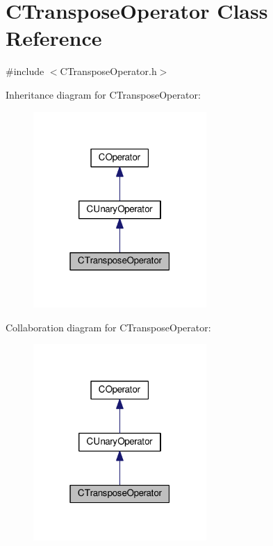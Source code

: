 \hypertarget{classCTransposeOperator}{}\section{C\+Transpose\+Operator Class Reference}
\label{classCTransposeOperator}


{\ttfamily \#include $<$C\+Transpose\+Operator.\+h$>$}



Inheritance diagram for C\+Transpose\+Operator\+:\nopagebreak
\begin{figure}[H]
\begin{center}
\leavevmode
\includegraphics[width=187pt]{classCTransposeOperator__inherit__graph}
\end{center}
\end{figure}


Collaboration diagram for C\+Transpose\+Operator\+:\nopagebreak
\begin{figure}[H]
\begin{center}
\leavevmode
\includegraphics[width=187pt]{classCTransposeOperator__coll__graph}
\end{center}
\end{figure}
